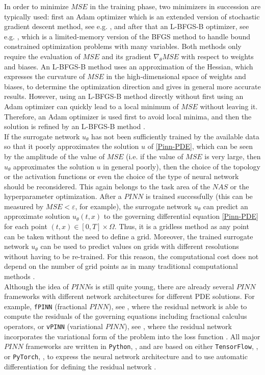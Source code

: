 In order to minimize $MSE$ in the training phase, two minimizers in succession are typically used: first an Adam optimizer which is an extended version of stochastic gradient descent method, see e.g. \cite{KingmaBa:2017}, and after that an L-BFGS-B optimizer, see e.g. \cite{ByrdLuNocedalZhu:1995}, which is a limited-memory version of the BFGS method to handle bound constrained optimization problems with many variables. Both methods only require the evaluation of $MSE$ and its gradient $\nabla_\theta MSE$ with respect to weights and biases. An L-BFGS-B method uses an approximation of the Hessian, which expresses the curvature of $MSE$ in the high-dimensional space of weights and biases, to determine the optimization direction and gives in general more accurate results. However, using an L-BFGS-B method directly without first using an Adam optimizer can quickly lead to a local minimum of $MSE$ without leaving it. Therefore, an Adam optimizer is used first to avoid local minima, and then the solution is refined by an L-BFGS-B method \cite[p.~6]{Markidis:2021}. \\
If the surrogate network $u_\theta$ has not been sufficiently trained by the available data so that it poorly approximates the solution $u$ of \cref{Pinn-PDE}, which can be seen by the amplitude of the value of $MSE$ (i.e. if the value of $MSE$ is very large, then $u_\theta$ approximates the solution $u$ in general poorly), then the choice of the topology or the activation functions or even the choice of the type of neural network should be reconsidered. This again belongs to the task area of the $NAS$ or the hyperparameter optimization. After a $PINN$ is trained successfully (this can be measured by $MSE < \varepsilon$, for example), the surrogate network $u_\theta$ can predict an approximate solution $u_\theta (t,x)$ to the governing differential equation \cref{Pinn-PDE} for each point $(t,x) \in \left[ 0, T \right] \times \Omega$. Thus, it is a gridless method as any point can be taken without the need to define a grid. Moreover, the trained surrogate network $u_\theta$ can be used to predict values on grids with different resolutions without having to be re-trained. For this reason, the computational cost does not depend on the number of grid points as in many traditional computational methods \cite[p.~2]{Markidis:2021}. \\
Although the idea of $PINN$s is still quite young, there are already several $PINN$ frameworks with different network architectures for different PDE solutions. For example, \lstinline!fPINN! (fractional $PINN$), see \cite{PangLuKarniadakis:2019}, where the residual network is able to compute the residuals of the governing equations including fractional calculus operators, or \lstinline!vPINN! (variational $PINN$), see \cite{KharazmiZhangKarniadakis:2019}, where the residual network incorporates the variational form of the problem into the loss function \cite[pp.~5-6]{Markidis:2021}. All major $PINN$ frameworks are written in \lstinline!Python!, \cite{Python}, and are based on either \lstinline!TensorFlow!, \cite{TensorFlow}, or \lstinline!PyTorch!, \cite{PyTorch}, to express the neural network architecture and to use automatic differentiation for defining the residual network \cite[p.~6]{Markidis:2021}. 

